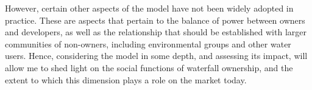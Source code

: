 However, certain other aspects of the model have not been widely adopted in practice. These are aspects  that pertain to the balance of power between owners and developers, as well as the relationship that should be established with larger communities of non-owners, including environmental groups and other water users. Hence, considering the model in some depth, and assessing its impact, will allow me to shed light on the social functions of waterfall ownership, and the extent to which this dimension plays a role on the market today.



